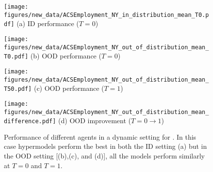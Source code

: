 \begin{figure}[h]
\centering
\begin{minipage}[b]{0.24\textwidth}
\centering
\texttt{[image: figures/new\_data/ACSEmployment\_NY\_in\_distribution\_mean\_T0.pdf]}
{\small{{(a)} ID performance ($T=0$) }}
\end{minipage}
\hfill
\begin{minipage}[b]{0.24\textwidth}
\centering \texttt{[image: figures/new\_data/ACSEmployment\_NY\_out\_of\_distribution\_mean\_T0.pdf]}
{\small{{(b)} OOD performance ($T=0$) }}
\end{minipage}
\hfill
\begin{minipage}[b]{0.24\textwidth}
\centering \texttt{[image: figures/new\_data/ACSEmployment\_NY\_out\_of\_distribution\_mean\_T50.pdf]}
{\small{{(c)} OOD performance ($T= 1$) }}
\end{minipage}
\hfill
\begin{minipage}[b]{0.24\textwidth}
\centering \texttt{[image: figures/new\_data/ACSEmployment\_NY\_out\_of\_distribution\_mean\_difference.pdf]}
{\small{{(d)} OOD improvement ($T=0 \to 1$) }}
\end{minipage}
\caption{Performance of different agents in a dynamic setting for \acsemployment. In this case hypermodels perform the best in both the ID setting (a) but in the OOD setting [(b),(c), and (d)], all the models perform similarly at $T=0$ and $T=1$.}
\label{fig:dynamic_setting_ACS_employment}
\end{figure}



